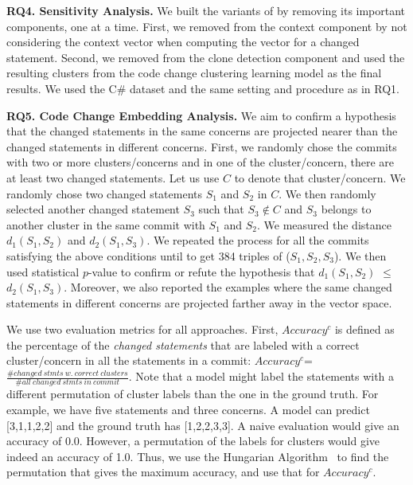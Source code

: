 \noindent\textbf{RQ4. Sensitivity Analysis.}
We built the variants of {\tool} by removing its important components,
one at a time. First, we removed from {\tool} the context component by
not considering the context vector when computing the vector
for a changed statement. Second, we removed from {\tool} the
clone detection component and used the resulting clusters from the
code change clustering learning model as the final results. We used the
C\# dataset and the same setting and procedure as in RQ1.


\noindent\textbf{RQ5. Code Change Embedding Analysis.}
We aim to confirm a hypothesis that the changed statements in the same
concerns are projected nearer than the changed statements in different
concerns. First, we randomly chose the commits with two or more
clusters/concerns and in one of the cluster/concern, there are at
least two changed statements. Let us use $C$ to denote that
cluster/concern. We randomly chose two changed statements $S_1$ and
$S_2$ in $C$. We then randomly selected another changed statement
$S_3$ such that $S_3 \notin C$ and $S_3$ belongs to another cluster in
the same commit with $S_1$ and $S_2$. We measured the distance
$d_1(S_1,S_2)$ and $d_2(S_1,S_3)$. We repeated the process for all the
commits satisfying the above conditions until to get 384 triples of
($S_1, S_2, S_3$). We then used statistical $p$-value to confirm or
refute the hypothesis that $d_1(S_1,S_2)$ $\leq$ $d_2(S_1,S_3)$.
Moreover, we also reported the examples where the same changed
statements in different concerns are projected farther away in the
vector space.




 We use two evaluation metrics for
all approaches. First, $Accuracy^{c}$ is defined as the percentage of
the {\em changed statements} that are labeled with a correct
cluster/concern in all the statements in a commit: $Accuracy^{c}$=
$\frac{\# changed\:stmts\:w.\:correct\:clusters}{\#
all\:changed\:stmts\:in\:commit}$.  Note that a model might label the
statements with a different permutation of cluster labels than the one
in the ground truth. For example, we have five statements and three
concerns. A model can predict [3,1,1,2,2] and the ground truth has
[1,2,2,3,3]. A naive evaluation would give an accuracy of
0.0. However, a permutation of the labels for clusters would give
indeed an accuracy of 1.0. Thus, we use the Hungarian
Algorithm~\cite{hungarian-algo} to find the permutation that gives the
maximum accuracy, and use that for $Accuracy^{c}$.

